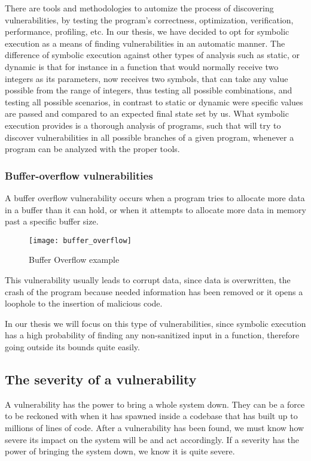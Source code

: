 There are tools and methodologies to automize the process of discovering vulnerabilities, by testing the program's correctness, optimization, verification, performance, profiling, etc. In our thesis, we have decided to opt for symbolic execution as a means of finding vulnerabilities in an automatic manner. The difference of symbolic execution against other types of analysis such as static, or dynamic is that for instance in a function that would normally receive two integers as its parameters, now receives two symbols, that can take any value possible from the range of integers, thus testing all possible combinations, and testing all possible scenarios, in contrast to static or dynamic were specific values are passed and compared to an expected final state set by us. What symbolic execution provides is a thorough analysis of programs, such that will try to discover vulnerabilities in all possible branches of a given program, whenever a program can be analyzed with the proper tools.

\subsubsection{Buffer-overflow vulnerabilities}

A buffer overflow vulnerability occurs when a program tries to allocate more data in a buffer than it can hold, or when it attempts to allocate more data in memory past a specific buffer size. 

\begin{figure}[H]
	\caption{Buffer Overflow example}
	\centering
	\texttt{[image: buffer\_overflow]}
\end{figure}

This vulnerability usually leads to corrupt data, since data is overwritten, the crash of the program because needed information has been removed or it opens a loophole to the insertion of malicious code.

In our thesis we will focus on this type of vulnerabilities, since symbolic execution has a high probability of finding any non-sanitized input in a function, therefore going outside its bounds quite easily. 

\subsection{The severity of a vulnerability}

A vulnerability has the power to bring a whole system down. They can be a force to be reckoned with when it has spawned inside a codebase that has built up to millions of lines of code. After a vulnerability has been found, we must know how severe its impact on the system will be and act accordingly. If a severity has the power of bringing the system down, we know it is quite severe. 

